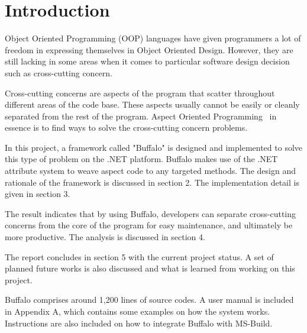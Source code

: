 \chapter{Introduction}

Object Oriented Programming (OOP) languages have given programmers a lot of freedom in expressing themselves in Object Oriented Design. However, they are still lacking in some areas when it comes to particular software design decision such as cross-cutting concern.

Cross-cutting concerns are aspects of the program that scatter throughout different areas of the code base. These aspects usually cannot be easily or cleanly separated from the rest of the program. Aspect Oriented Programming~\cite{aop} in essence is to find ways to solve the cross-cutting concern problems.

In this project, a framework called "Buffalo" is designed and implemented to solve this type of problem on the .NET platform. Buffalo makes use of the .NET attribute system to weave aspect code to any targeted methods. The design and rationale of the framework is discussed in section 2. The implementation detail is given in section 3.

The result indicates that by using Buffalo, developers can separate cross-cutting concerns from the core of the program for easy maintenance, and ultimately be more productive. The analysis is discussed in section 4.

The report concludes in section 5 with the current project status. A set of planned future works is also discussed and what is learned from working on this project.

Buffalo comprises around 1,200 lines of source codes. A user manual is included in Appendix A, which contains some examples on how the system works. Instructions are also included on how to integrate Buffalo with MS-Build.
